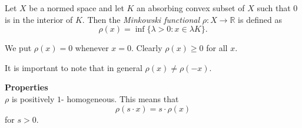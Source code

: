 \documentclass[12pt]{article}
\begin{document}
Let $X$ be a normed space and let 
   $K$ an absorbing  convex subset of $X$ such that 
   $0$ is in the interior of $K$.
Then the 
  \emph{Minkowski functional} 
  $\rho \colon X \to \mathbb{R}$ is defined as 
$$
  \rho(x) = \inf \{ \lambda>0 \colon x \in \lambda K \}.
$$

We put $\rho(x) = 0$ whenever $x = 0$.  Clearly $\rho(x) \geq 0$ for all $x$.

It is important to note that in general $\rho(x) \neq \rho(-x)$.

{\bf Properties}\\
$\rho$ is positively $1$- homogeneous.  This means that $$\rho(s \cdot x) = s \cdot \rho(x)$$
for $s > 0$.
\end{document}
